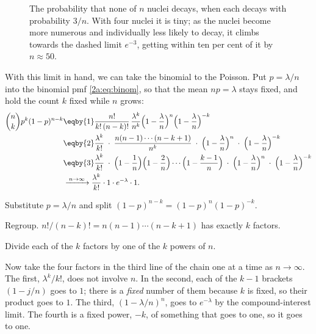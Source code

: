 \begin{figure}[htbp]
\centering
{}
\caption{The probability that none of $n$ nuclei decays, when each decays with probability $3/n$. With four nuclei it is tiny; as the nuclei become more numerous and individually less likely to decay, it climbs towards the dashed limit $e^{-3}$, getting within ten per cent of it by $n\approx50$.}
\label{2a:fig:compound}
\end{figure}

With this limit in hand, we can take the binomial to the Poisson. Put $p=\lambda/n$ into the binomial pmf \eqref{2a:eq:binom}, so that the mean $np=\lambda$ stays fixed, and hold the count $k$ fixed while $n$ grows:
\begin{align}
  \binom nk p^k(1-p)^{n-k}
  &\eqby{1} \frac{n!}{k!\,(n-k)!}\,\frac{\lambda^k}{n^k}\Bigl(1-\frac\lambda n\Bigr)^{n}\Bigl(1-\frac\lambda n\Bigr)^{-k} \nonumber\\
  &\eqby{2} \frac{\lambda^k}{k!}\;\cdot\;\frac{n(n-1)\cdots(n-k+1)}{n^k}\;\cdot\;\Bigl(1-\frac\lambda n\Bigr)^{n}\;\cdot\;\Bigl(1-\frac\lambda n\Bigr)^{-k} \nonumber\\
  &\eqby{3} \frac{\lambda^k}{k!}\;\cdot\;\Bigl(1-\frac1n\Bigr)\Bigl(1-\frac2n\Bigr)\cdots\Bigl(1-\frac{k-1}n\Bigr)\;\cdot\;\Bigl(1-\frac\lambda n\Bigr)^{n}\;\cdot\;\Bigl(1-\frac\lambda n\Bigr)^{-k} \nonumber\\
  &\xrightarrow{\;n\to\infty\;} \frac{\lambda^k}{k!}\cdot 1\cdot e^{-\lambda}\cdot 1 . \label{2a:eq:poislimit}
\end{align}
\begin{explain}
  \item Substitute $p=\lambda/n$ and split $(1-p)^{n-k}=(1-p)^n(1-p)^{-k}$.
  \item Regroup. $n!/(n-k)!=n(n-1)\cdots(n-k+1)$ has exactly $k$ factors.
  \item Divide each of the $k$ factors by one of the $k$ powers of $n$.
\end{explain}
Now take the four factors in the third line of the chain one at a time as $n\to\infty$. The first, $\lambda^k/k!$, does not involve $n$. In the second, each of the $k-1$ brackets $(1-j/n)$ goes to $1$; there is a \emph{fixed} number of them because $k$ is fixed, so their product goes to $1$. The third, $(1-\lambda/n)^n$, goes to $e^{-\lambda}$ by the compound-interest limit. The fourth is a fixed power, $-k$, of something that goes to one, so it goes to one.

